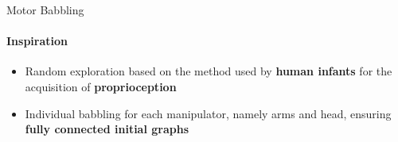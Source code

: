 \documentclass[aspectratio=169]{beamer}
\begin{document}
\begin{frame}{Motor Babbling}
	\framesubtitle{Inspiration}
	\begin{minipage}{0.5\linewidth}
		\vspace{-0.5cm}
		\begin{itemize}
			\item Random exploration based on the method used by \textcolor{hbrsblue}{\textbf{human infants}} for the acquisition of \textcolor{hbrsblue}{\textbf{proprioception}}	
			\newline
			\item Individual babbling for each manipulator, namely arms and head, ensuring \textcolor{hbrsblue}{\textbf{fully connected initial graphs}}
		\end{itemize}
	\end{minipage}\hfill
	\begin{minipage}{0.5\linewidth}
		\begin{center}
		\end{center}	
	\end{minipage}
\end{frame}
\end{document}

